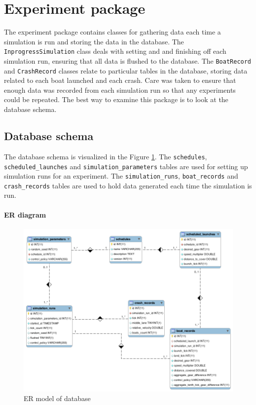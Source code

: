 \section{Experiment package}\label{software:experiment}
The experiment package contains classes for gathering data each time a
simulation is run and storing the data in the database. The
\texttt{InprogressSimulation} class deals with setting and and finishing off
each simulation run, ensuring that all data is flushed to the
database. The \texttt{BoatRecord} and \texttt{CrashRecord} classes relate to particular
tables in the database, storing data related to each boat launched and
each crash. Care was taken to ensure that enough data was recorded
from each simulation run so that any experiments could be repeated.
The best way to examine this package is to look at the database schema.

\subsection{Database schema}\label{software:experiment:db}

The database schema is visualized in the Figure
\ref{software:fig:eer}. The \texttt{schedules}, \texttt{scheduled\_launches} and
\texttt{simulation\_parameters} tables are used for setting up simulation runs for an
experiment. The \texttt{simulation\_runs}, \texttt{boat\_records} and
\texttt{crash\_records} tables are used to hold data generated each
time the simulation is run.

\paragraph{ER diagram}

\begin{figure}
\begin{center}
  \includegraphics[scale=0.3]{images/eer.png}
  \caption{ER model of database}
  \label{software:fig:eer}
\end{center}
\end{figure}

